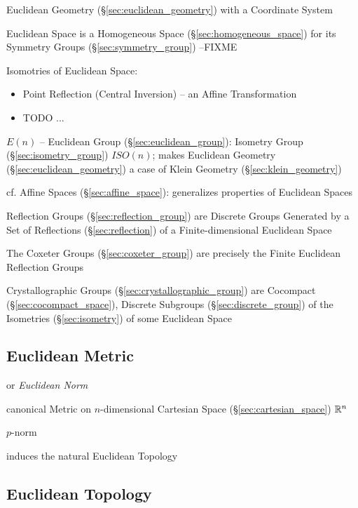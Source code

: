 Euclidean Geometry (\S\ref{sec:euclidean_geometry}) with a Coordinate System

Euclidean Space is a Homogeneous Space (\S\ref{sec:homogeneous_space}) for its
Symmetry Groups (\S\ref{sec:symmetry_group}) --FIXME

Isomotries of Euclidean Space:
\begin{itemize}
  \item Point Reflection (Central Inversion) -- an Affine Transformation
  \item TODO
  ...
\end{itemize}

$E(n)$ -- Euclidean Group (\S\ref{sec:euclidean_group}): Isometry Group
(\S\ref{sec:isometry_group}) $ISO(n)$; makes Euclidean Geometry
(\S\ref{sec:euclidean_geometry}) a case of Klein Geometry
(\S\ref{sec:klein_geometry})

cf. Affine Spaces (\S\ref{sec:affine_space}): generalizes properties
of Euclidean Spaces

Reflection Groups (\S\ref{sec:reflection_group}) are Discrete Groups Generated
by a Set of Reflections (\S\ref{sec:reflection}) of a Finite-dimensional
Euclidean Space

The Coxeter Groups (\S\ref{sec:coxeter_group}) are precisely the Finite
Euclidean Reflection Groups

Crystallographic Groups (\S\ref{sec:crystallographic_group}) are Cocompact
(\S\ref{sec:cocompact_space}), Discrete Subgroups (\S\ref{sec:discrete_group})
of the Isometries (\S\ref{sec:isometry}) of some Euclidean Space



\subsection{Euclidean Metric}\label{sec:euclidean_metric}

or \emph{Euclidean Norm}

canonical Metric on $n$-dimensional Cartesian Space
(\S\ref{sec:cartesian_space}) $\mathbb{R}^n$

$p$-norm

induces the natural Euclidean Topology



\subsection{Euclidean Topology}\label{sec:euclidean_topology}


